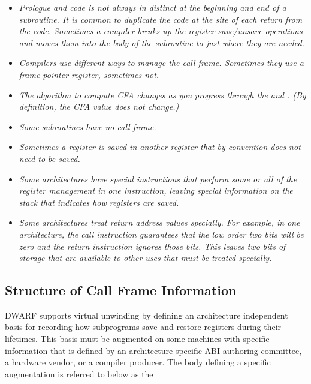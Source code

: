 \begin{itemize} %

\item \textit{Prologue 
and 
 code is not always in 
distinct 
at the beginning and end of a subroutine. It is common
to duplicate the  code 
at the site of each return
from the code. Sometimes a compiler breaks up the register
save/unsave operations and moves them into the body of the
subroutine to just where they are needed.}


\item \textit{Compilers use different ways to manage the call
frame. Sometimes they use a frame pointer register, sometimes
not.}

\item \textit{The algorithm to compute CFA changes as you progress through
the  
and . 
(By definition, the CFA value
does not change.)}

\item \textit{Some subroutines have no call frame.}

\item \textit{Sometimes a register is saved in another register that by
convention does not need to be saved.}

\item \textit{Some architectures have special instructions that perform
some or all of the register management in one instruction,
leaving special information on the stack that indicates how
registers are saved.}

\item \textit{Some architectures treat return address values specially. For
example, in one architecture, the call instruction guarantees
that the low order two bits will be zero and the return
instruction ignores those bits. This leaves two bits of
storage that are available to other uses that must be treated
specially.}

\end{itemize}


\subsection{Structure of Call Frame Information}
\label{chap:structureofcallframeinformation}

DWARF supports virtual unwinding by defining an architecture
independent basis for recording how subprograms save and restore
registers during their lifetimes. This basis must be augmented
on some machines with specific information that is defined by
an architecture specific ABI authoring committee, a hardware
vendor, or a compiler producer. The body defining a specific
augmentation is referred to below as the 

